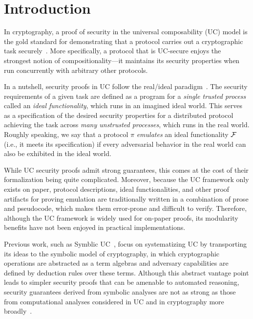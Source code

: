 \section{Introduction}
\label{sec:introduction}

In cryptography, a proof of security in the universal composability (UC) model
is the gold standard for demonstrating that a protocol carries out a
cryptographic task securely~\cite{canetti2001universally}. More specifically, a
protocol that is UC-secure enjoys the strongest notion of compositionality---it
maintains its security properties when run concurrently with arbitrary other
protocols.

In a nutshell, security proofs in UC follow the real/ideal
paradigm~\cite{goldreich1987play}. The security requirements of a given task are
defined as a program for a \emph{single trusted process} called an \emph{ideal
  functionality}, which runs in an imagined ideal world. This serves as a
specification of the desired security properties for a distributed protocol
achieving the task across \emph{many unstrusted processes}, which runs in the
real world. Roughly speaking, we say that a protocol $\pi$ \emph{emulates} an
ideal functionality $\mathcal{{F}}$ (i.e., it meets its specification) if every
adversarial behavior in the real world can also be exhibited in the ideal world.

While UC security proofs admit strong guarantees, this comes at the cost of
their formalization being quite complicated. Moreover, because the UC framework
only exists on paper, protocol descriptions, ideal functionalities, and other
proof artifacts for proving emulation are traditionally written in a combination
of prose and pseudocode, which makes them error-prone and difficult to
verify. Therefore, although the UC framework is widely used for on-paper proofs,
its modularity benefits have not been enjoyed in practical implementations.

Previous work, such as Symblic UC~\cite{bohl2016symbolic}, focus on
systematizing UC by transporting its ideas to the symbolic model of
cryptography, in which cryptographic operations are abstracted as a term
algebras and adversary capabilities are defined by deduction rules over these
terms. Although this abstract vantage point leads to simpler security proofs
that can be amenable to automated reasoning, security guarantees derived from
symbolic analyses are not as strong as those from computational analyses
considered in UC and in cryptography more broadly~\cite{cortier2011survey}.

